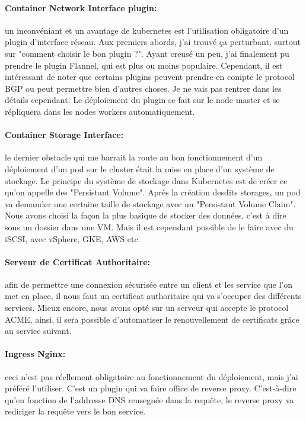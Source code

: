 \paragraph{Container Network Interface plugin:} un inconvéniant et un avantage de kubernetes est l'utilisation obligatoire d'un plugin d'interface réseau. Aux premiers abords, j'ai trouvé ça perturbant, surtout sur "comment choisir le bon plugin ?". Ayant creusé un peu, j'ai finalement pu prendre le plugin Flannel, qui est plus ou moins populaire. Cependant, il est intéressant de noter que certains plugins peuvent prendre en compte le protocol BGP ou peut permettre bien d'autres choses. Je ne vais pas rentrer dans les détails cependant. Le déploiement du plugin se fait sur le node master et se répliquera dans les nodes workers automatiquement.

\paragraph{Container Storage Interface:} le dernier obstacle qui me barrait la route au bon fonctionnement d'un déploiement d'un pod sur le cluster était la mise en place d'un système de stockage. Le principe du système de stockage dans Kubernetes est de créer ce qu'on appelle des "Persistant Volume". Après la création desdits storages, un pod va demander une certaine taille de stockage avec un "Persistant Volume Claim". Nous avons choisi la façon la plus basique de stocker des données, c'est à dire sous un dossier dans une VM. Mais il est cependant possible de le faire avec du iSCSI, avec vSphere, GKE, AWS etc.

\paragraph{Serveur de Certificat Authoritaire:} afin de permettre une connexion sécurisée entre un client et les service que l'on met en place, il nous faut un certificat authoritaire qui va s'occuper des différents services. Mieux encore, nous avons opté sur un serveur qui accepte le protocol ACME, ainsi, il sera possible d'automatiser le renouvellement de certificats grâce au service suivant.

\paragraph{Ingress Nginx:} ceci n'est pas réellement obligatoire au fonctionnement du déploiement, mais j'ai préféré l'utiliser. C'est un plugin qui va faire office de reverse proxy. C'est-à-dire qu'en fonction de l'addresse DNS rensegnée dans la requête, le reverse proxy va rediriger la requête vers le bon service. 

